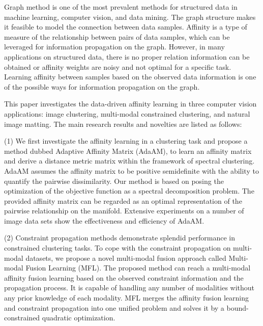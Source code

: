 \begin{abstract}
\end{abstract}

\begin{enabstract}
  Graph method is one of the most prevalent methods for structured data in machine learning, computer vision, and data mining. The graph structure makes it feasible to model the connection between data samples. Affinity is a type of measure of the relationship between pairs of data samples, which can be leveraged for information propagation on the graph. However, in many applications on structured data, there is no proper relation information can be obtained or affinity weights are noisy and not optimal for a specific task. Learning affinity between samples based on the observed data information is one of the possible ways for information propagation on the graph.

  This paper investigates the data-driven affinity learning in three computer vision applications: image clustering, multi-modal constrained clustering, and natural image matting. The main research results and novelties are listed as follows:

  (1) We first investigate the affinity learning in a clustering task and propose a method dubbed Adaptive Affinity Matrix (AdaAM), to learn an affinity matrix and derive a distance metric matrix within the framework of spectral clustering. AdaAM assumes the affinity matrix to be positive semidefinite with the ability to quantify the pairwise dissimilarity. Our method is based on posing the optimization of the objective function as a spectral decomposition problem. The provided affinity matrix can be regarded as an optimal representation of the pairwise relationship on the manifold. Extensive experiments on a number of image data sets show the effectiveness and efficiency of AdaAM.

  (2) Constraint propagation methods demonstrate splendid performance in constrained clustering tasks. To cope with the constraint propagation on multi-modal datasets, we propose a novel multi-modal fusion approach  called Multi-modal Fusion Learning (MFL). The proposed method can reach a multi-modal affinity fusion learning based on the observed constraint information and the propagation process. It is capable of handling any number of modalities without any prior knowledge of each modality. MFL merges the affinity fusion learning and constraint propagation into one unified problem and solves it by a bound-constrained quadratic optimization.


\end{enabstract}
